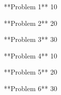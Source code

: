 **Problem 1**
10

**Problem 2**
20

**Problem 3**
30

**Problem 4**
10

**Problem 5**
20

**Problem 6**
30
